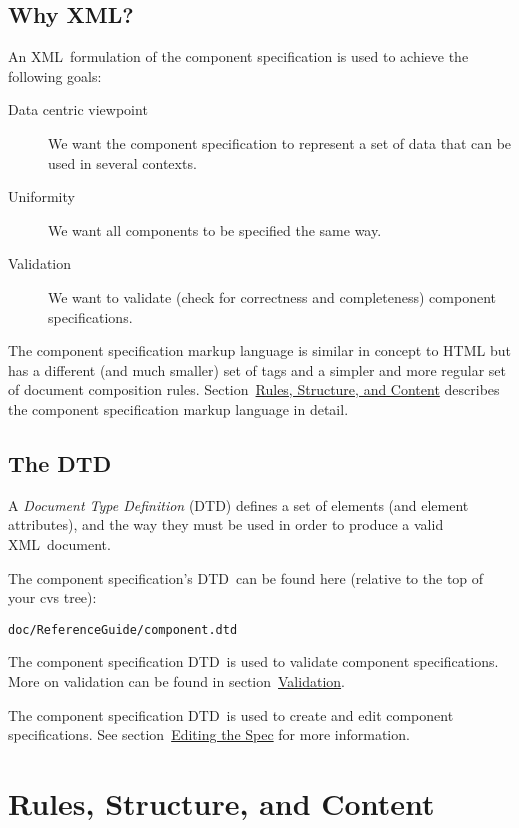 \documentclass{article}
\newcommand{\acronym}[1]{#1}
\newcommand{\dfn}[1]{\emph{#1}}
\newcommand{\xml}{\acronym{XML}}
\newcommand{\dtd}{\acronym{DTD}}
\newcommand{\sectitle}[1]{\emph{#1}}
\newcommand{\sechyperref}[1]{\hyperref{\sectitle{#1}}{}{}{#1}}
\newcommand{\SUBSECwhyXml}{Why XML?}
\newcommand{\SUBSECwhatDtd}{The DTD}
\newcommand{\SECcontent}{Rules, Structure, and Content}
\newcommand{\SECediting}{Editing the Spec}
\newcommand{\SECvalidation}{Validation}
\begin{document}
\subsection{\SUBSECwhyXml}
\label{\SUBSECwhyXml}

An \xml\ formulation of the component specification is used to achieve
the following goals:

\begin{description}
\item[Data centric viewpoint] We want the component specification to represent
  a set of data that can be used in several contexts.

\item[Uniformity] We want all components to be specified the same way.

\item[Validation] We want to validate (check for correctness and
  completeness) component specifications.
\end{description}

The component specification markup language is similar in concept to HTML but
has a different (and much smaller) set of tags and a simpler and more
regular set of document composition rules.
Section~\sechyperref{\SECcontent} describes
the component specification markup language in detail.

\subsection{\SUBSECwhatDtd}
\label{\SUBSECwhatDtd}

A \dfn{Document Type Definition} (\dtd) defines a set of elements (and
element attributes), and the way they must be used in order to produce a
valid \xml\ document.

The component specification's \dtd\ can be found here (relative to the top
of your cvs tree):

\begin{verbatim}
doc/ReferenceGuide/component.dtd
\end{verbatim}

The component specification \dtd\ is used to validate component
specifications.  More on validation can be found in
section~\sechyperref{\SECvalidation}.

The component specification \dtd\ is used to create and edit component
specifications.  See
section~\sechyperref{\SECediting} for more
information.

\section{\SECcontent}
\label{\SECcontent}
\end{document}
